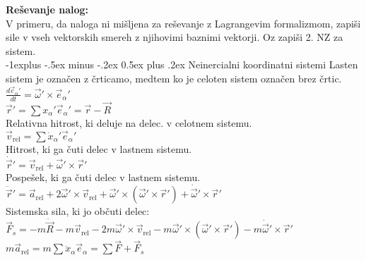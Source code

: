 \documentclass[12pt,landscape]{article}
\makeatletter
\renewcommand{\subsection}{\@startsection{subsection}{2}{0mm}%
                                {-1explus -.5ex minus -.2ex}%
                                {0.5ex plus .2ex}%
                                {\normalfont\normalsize\bfseries}}
\newcommand{\rv}{\vec{r}}
\newcommand{\vv}{\vec{v}}
\newcommand{\av}{\vec{a}}
\newcommand{\F}{\vec{F}}
\makeatother
\begin{document}
\begin{multicols}{3}
\textbf{Reševanje nalog:}\\
V primeru, da naloga ni mišljena za reševanje z Lagrangevim formalizmom, zapiši sile v vseh vektorskih smereh z njihovimi baznimi vektorji. Oz zapiši 2. NZ za sistem. \medskip \\
\subsection{Neinercialni koordinatni sistemi}
Lasten sistem je označen z črticamo, medtem ko je celoten sistem označen brez črtic. \medskip \\
$\frac{d \vec e_\alpha'}{dt} = \vec \omega' \times \vec e_\alpha'$ \\
$\rv' = \sum x_\alpha' \vec e_\alpha' = \rv - \vec R$ \\
Relativna hitrost, ki deluje na delec. v celotnem sistemu. \\
$\vv_\mathrm{rel} = \sum \dot x_\alpha' \vec e_\alpha'$ \\
Hitrost, ki ga čuti delec v lastnem sistemu. \\
$\dot \rv' = \vv_\mathrm{rel} + \vec \omega ' \times \rv'$ \\
Pospešek, ki ga čuti delec v lastnem sistemu. \\
$\ddot \rv' = \av_\mathrm{rel} + 2 \vec \omega' \times \vv_\mathrm{rel} + \vec \omega' \times (\vec \omega' \times \rv') + \dot{\vec \omega}' \times \rv'$ \\
Sistemska sila, ki jo občuti delec: \\
$\F_s = - m \ddot{\vec R} - m \vv_\mathrm{rel} - 2 m \vec \omega' \times \vv_\mathrm{rel} - m \vec \omega' \times (\vec \omega' \times \rv') - m \dot{\vec \omega}' \times \rv'$ \\
$m \av_\mathrm{rel} = m \sum \ddot x_\alpha \vec e_\alpha = \sum \F + \F_s$ \medskip \\


\end{multicols}
\end{document}
